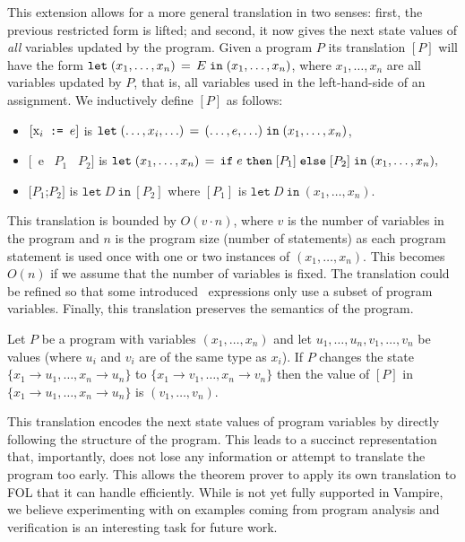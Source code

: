 This extension allows for a more general translation in two senses:
first, the previous restricted form is lifted; and second, it now
gives the next state values of {\it all} variables updated by the program. Given a program $P$ its translation $[P]$ will have the form $\mathtt{let}\;{(x_1,\ldots,x_n)}\,=\,{E}\;\allowbreak\mathtt{in}\;{(x_1,\ldots,x_n)}$, where $x_1,\ldots,x_n$ are all variables updated by $P$, that is, all variables used in the left-hand-side of an assignment. We inductively define $[P]$ as follows:
\begin{itemize}
	\item $[\text{x}_i \text{\texttt{ := }} e]$ is $\mathtt{let}\;{(\ldots,x_i,\ldots)}\,=\,{(\ldots,e,\ldots)}\;\allowbreak\mathtt{in}\;{(x_1,\ldots,x_n)}$,
	\item $[$\IF\ e \THEN\ $P_1$ \ELSE\ $P_2]$ is $\mathtt{let}\;{(x_1,\ldots,x_n)}\,=\,{\mathtt{if}\;{e}\;\allowbreak\mathtt{then}\;{[P_1]}\;\allowbreak\mathtt{else}\;{[P_2]}}\;\allowbreak\mathtt{in}\;{(x_1,\ldots,x_n)},$
	\item $[P_1$;$P_2]$ is $\mathtt{let}~D~\mathtt{in}~[P_2]$ where $[P_1]$ is $\mathtt{let}~D~\mathtt{in}~(x_1,\ldots,x_n)$.
\end{itemize}
This translation is bounded by $O(v\cdot n)$, where $v$ is the number
of variables in the program and $n$ is the program size (number of
statements) as each program statement is used once with one or two
instances of $(x_1,\ldots,x_n)$.
This becomes $O(n)$ if we assume that the number of
variables is fixed. The translation could be refined so that some introduced  \LETIN\
expressions only use a subset of program variables.
Finally, this translation preserves the semantics
of the program.

\begin{theorem}\rm
  Let $P$ be a program with variables $(x_1,\ldots,x_n)$ and let $u_1,\ldots,u_n, v_1, \ldots, v_n$ be values (where $u_i$ and $v_i$ are of the same type as $x_i$). If $P$ changes the state $\{x_1\to u_1,\ldots,x_n\to u_n\}$ to $\{x_1\to v_1,\ldots,x_n\to v_n\}$ then the value of $[P]$ in $\{x_1\to u_1,\ldots,x_n\to u_n\}$ is $(v_1,\ldots,v_n)$.
\end{theorem}

This translation encodes the next state values of program variables by
directly following the structure of the program. This leads to a
succinct representation that, importantly, does not lose any
information or attempt to translate the program too early. This allows
the theorem prover to apply its own translation to FOL that it can
handle efficiently.   While \foolp{} is not yet fully supported in
Vampire, we believe experimenting with \foolp{} on
examples coming from program analysis and verification is an
interesting task for future work.


